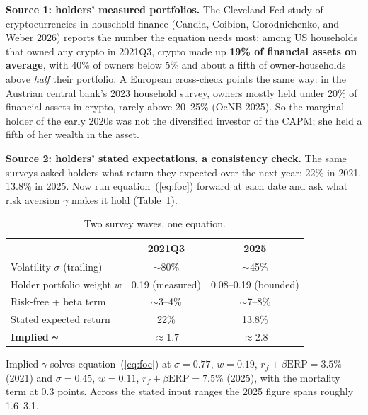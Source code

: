 \documentclass[11pt]{article}
\begin{document}
\textbf{Source 1: holders' measured portfolios.} The Cleveland Fed study of cryptocurrencies in household finance (Candia, Coibion, Gorodnichenko, and Weber 2026) reports the number the equation needs most: among US households that owned any crypto in 2021Q3, crypto made up \textbf{19\% of financial assets on average}, with 40\% of owners below 5\% and about a fifth of owner-households above \emph{half} their portfolio. A European cross-check points the same way: in the Austrian central bank's 2023 household survey, owners mostly held under 20\% of financial assets in crypto, rarely above 20--25\% (OeNB 2025). So the marginal holder of the early 2020s was not the diversified investor of the CAPM; she held a fifth of her wealth in the asset.

\textbf{Source 2: holders' stated expectations, a consistency check.} The same surveys asked holders what return they expected over the next year: 22\% in 2021, 13.8\% in 2025. Now run equation~(\ref{eq:foc}) forward at each date and ask what risk aversion $\gamma$ makes it hold (Table~\ref{tab:gamma}).

\begin{table}[ht]\centering\small
\caption{Two survey waves, one equation.}
\label{tab:gamma}
\begin{tabular}{lcc}
\toprule
 & 2021Q3 & 2025 \\
\midrule
Volatility $\sigma$ (trailing) & $\sim$80\% & $\sim$45\% \\
Holder portfolio weight $w$ & 0.19 (measured) & 0.08--0.19 (bounded) \\
Risk-free + beta term & $\sim$3--4\% & $\sim$7--8\% \\
Stated expected return & 22\% & 13.8\% \\
\textbf{Implied} $\boldsymbol{\gamma}$ & $\boldsymbol{\approx 1.7}$ & $\boldsymbol{\approx 2.8}$ \\
\bottomrule
\end{tabular}
\par\smallskip\parbox{0.86\textwidth}{\footnotesize Implied $\gamma$ solves equation~(\ref{eq:foc}) at $\sigma=0.77$, $w=0.19$, $r_f+\beta\mathrm{ERP}=3.5\%$ (2021) and $\sigma=0.45$, $w=0.11$, $r_f+\beta\mathrm{ERP}=7.5\%$ (2025), with the mortality term at 0.3 points. Across the stated input ranges the 2025 figure spans roughly 1.6--3.1.}
\end{table}
\end{document}
